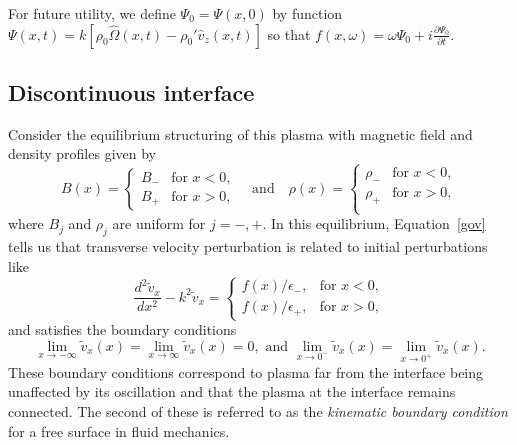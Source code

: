 \documentclass[12pt, draft]{../style-files/ociamthesis}
\begin{document}
For future utility, we define $\Psi_0 = \Psi(x, 0)$ by function $\Psi(x, t) = k[\rho_0\hat{\Omega}(x, t) - \rho_0'\hat{v}_z(x, t)]$ so that $f(x, \omega) = \omega \Psi_0 + i\frac{\partial \Psi_0}{\partial t}$.


\subsection{Discontinuous interface}

Consider the equilibrium structuring of this plasma with magnetic field and density profiles given by
\begin{equation}
B(x)=
\begin{cases}
B_- & \text{for  }x<0, \\
B_+ & \text{for  }x>0,
\end{cases}
\quad \text{and} \quad
\rho(x)=
\begin{cases}
\rho_- & \text{for  }x<0, \\
\rho_+ & \text{for  }x>0, \\
\end{cases}
\end{equation}
where $B_j$ and $\rho_j$ are uniform for $j = -, +$. In this equilibrium, Equation~\eqref{gov} tells us that transverse velocity perturbation is related to initial perturbations like
\begin{equation}
\frac{d^2\tilde{v}_x}{dx^2} - k^2\tilde{v}_x = 
\begin{cases}
f(x)/\epsilon_-, & \text{for  } x < 0,\\
f(x)/\epsilon_+, & \text{for  } x > 0,
\end{cases}
\label{ivp interface gov}
\end{equation}
and satisfies the boundary conditions
\begin{equation}
\lim_{x \to -\infty}\tilde{v}_x(x) = \lim_{x \to \infty}\tilde{v}_x(x) = 0, \text{ and } \lim_{x \to 0^-}\tilde{v}_x(x) = \lim_{x \to 0^+}\tilde{v}_x(x).
\label{ivp interface BC}
\end{equation}
These boundary conditions correspond to plasma far from the interface being unaffected by its oscillation and that the plasma at the interface remains connected. The second of these is referred to as the \textit{kinematic boundary condition} for a free surface in fluid mechanics.
\end{document}
